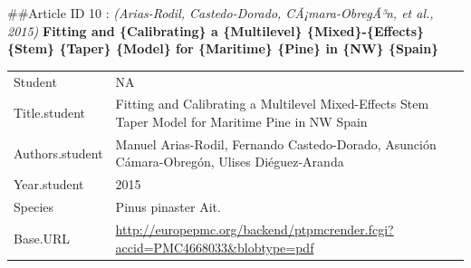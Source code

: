 \documentclass[]{article}
\begin{document}
\#\#Article ID 10 : \emph{(Arias-Rodil, Castedo-Dorado,
CÃ¡mara-ObregÃ³n, et al., 2015)} \textbf{Fitting and \{Calibrating\} a
\{Multilevel\} \{Mixed\}-\{Effects\} \{Stem\} \{Taper\} \{Model\} for
\{Maritime\} \{Pine\} in \{NW\} \{Spain\}}

\begin{longtable}[]{@{}ll@{}}
\toprule
\endhead
\begin{minipage}[t]{0.21\columnwidth}\raggedright
Student\strut
\end{minipage} & \begin{minipage}[t]{0.73\columnwidth}\raggedright
NA\strut
\end{minipage}\tabularnewline
\begin{minipage}[t]{0.21\columnwidth}\raggedright
Title.student\strut
\end{minipage} & \begin{minipage}[t]{0.73\columnwidth}\raggedright
Fitting and Calibrating a Multilevel Mixed-Effects Stem Taper Model for
Maritime Pine in NW Spain\strut
\end{minipage}\tabularnewline
\begin{minipage}[t]{0.21\columnwidth}\raggedright
Authors.student\strut
\end{minipage} & \begin{minipage}[t]{0.73\columnwidth}\raggedright
Manuel Arias-Rodil, Fernando Castedo-Dorado, Asunción Cámara-Obregón,
Ulises Diéguez-Aranda\strut
\end{minipage}\tabularnewline
\begin{minipage}[t]{0.21\columnwidth}\raggedright
Year.student\strut
\end{minipage} & \begin{minipage}[t]{0.73\columnwidth}\raggedright
2015\strut
\end{minipage}\tabularnewline
\begin{minipage}[t]{0.21\columnwidth}\raggedright
Species\strut
\end{minipage} & \begin{minipage}[t]{0.73\columnwidth}\raggedright
Pinus pinaster Ait.\strut
\end{minipage}\tabularnewline
\begin{minipage}[t]{0.21\columnwidth}\raggedright
Base.URL\strut
\end{minipage} & \begin{minipage}[t]{0.73\columnwidth}\raggedright
\url{http://europepmc.org/backend/ptpmcrender.fcgi?accid=PMC4668033\&blobtype=pdf}\strut
\end{minipage}\tabularnewline

\end{longtable}
\end{document}
